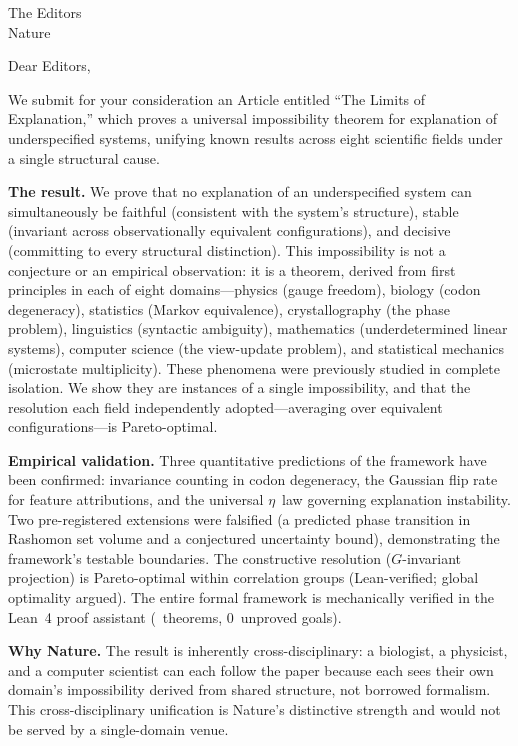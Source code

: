 \documentclass[11pt]{letter}
\begin{document}
\begin{letter}{The Editors\\Nature}

\opening{Dear Editors,}

We submit for your consideration an Article entitled ``The Limits of
Explanation,'' which proves a universal impossibility theorem for
explanation of underspecified systems, unifying known results across
eight scientific fields under a single structural cause.

\textbf{The result.}  We prove that no explanation of an
underspecified system can simultaneously be faithful (consistent with
the system's structure), stable (invariant across observationally
equivalent configurations), and decisive (committing to every
structural distinction).  This impossibility is not a conjecture or an
empirical observation: it is a theorem, derived from first principles
in each of eight domains---physics (gauge freedom), biology (codon
degeneracy), statistics (Markov equivalence), crystallography (the
phase problem), linguistics (syntactic ambiguity), mathematics
(underdetermined linear systems), computer science (the view-update
problem), and statistical mechanics (microstate multiplicity).  These
phenomena were previously studied in complete isolation.  We show they
are instances of a single impossibility, and that the resolution each
field independently adopted---averaging over equivalent
configurations---is Pareto-optimal.

\textbf{Empirical validation.}  Three quantitative predictions of the
framework have been confirmed: invariance counting in codon degeneracy,
the Gaussian flip rate for feature attributions, and the universal
$\eta$~law governing explanation instability.  Two pre-registered
extensions were falsified (a predicted phase transition in Rashomon set
volume and a conjectured uncertainty bound), demonstrating the
framework's testable boundaries.  The constructive resolution
($G$-invariant projection) is Pareto-optimal within correlation groups
(Lean-verified; global optimality argued).  The entire
formal framework is mechanically verified in the Lean~4 proof
assistant (\ClaimMainTheorems~theorems, 0~unproved goals).

\textbf{Why Nature.}  The result is inherently cross-disciplinary: a
biologist, a physicist, and a computer scientist can each follow the
paper because each sees their own domain's impossibility derived from
shared structure, not borrowed formalism.  This cross-disciplinary
unification is Nature's distinctive strength and would not be served by
a single-domain venue.


\end{letter}
\end{document}
